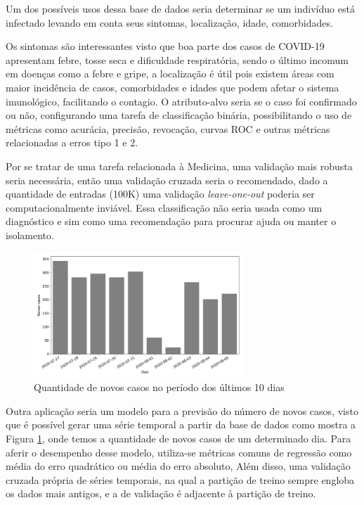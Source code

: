 \documentclass[12pt]{article}
\begin{document}
Um dos possíveis usos dessa base de dados seria determinar se um indivíduo está infectado levando em conta seus sintomas, localização, idade, comorbidades. 

Os sintomas são interessantes visto que boa parte dos casos de COVID-19 apresentam febre, tosse seca e dificuldade respiratória, sendo o último incomum em doenças como a febre e gripe, a localização é útil pois existem áreas com maior incidência de casos, comorbidades e idades que podem afetar o sistema imunológico, facilitando o contagio. O atributo-alvo seria se o caso foi confirmado ou não, configurando uma tarefa de classificação binária, possibilitando o uso de métricas como acurácia, precisão, revocação, curvas ROC e outras métricas relacionadas a erros tipo 1 e 2. 

Por se tratar de uma tarefa relacionada à Medicina, uma validação mais robusta seria necessária, então uma validação cruzada seria o recomendado, dado a quantidade de entradas (100K) uma validação \emph{leave-one-out} poderia ser computacionalmente inviável. Essa classificação não seria usada como um diagnóstico e sim como uma recomendação para procurar ajuda ou manter o isolamento.

\begin{figure}[ht]
    \centering
    \includegraphics[width=0.7\textwidth]{casos_10_dias.png}
    \caption{Quantidade de novos casos no período dos últimos 10 dias}
    \label{fig:casos_10_dias}
\end{figure}

Outra aplicação seria um modelo para a previsão do número de novos casos, visto que é possível gerar uma série temporal a partir da base de dados como mostra a Figura \ref{fig:casos_10_dias}, onde temos a quantidade de novos casos de um determinado dia. Para aferir o desempenho desse modelo, utiliza-se métricas comuns de regressão como média do erro quadrático ou média do erro absoluto, Além disso, uma validação cruzada própria de séries temporais, na qual a partição de treino sempre engloba os dados mais antigos, e a de validação é adjacente à partição de treino. 
\end{document}
